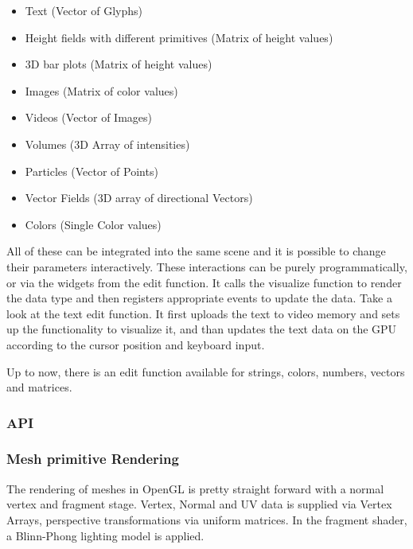 \begin{itemize}
	\item Text (Vector of Glyphs)
	\item Height fields with different primitives (Matrix of height values)
	\item 3D bar plots (Matrix of height values)
	\item Images (Matrix of color values)
	\item Videos (Vector of Images)
	\item Volumes (3D Array of intensities)
	\item Particles (Vector of Points)
	\item Vector Fields (3D array of directional Vectors)
    \item Colors (Single Color values)
\end{itemize}

All of these can be integrated into the same scene and it is possible to change their parameters interactively.
These interactions can be purely programmatically, or via the widgets from the edit function.
It calls the visualize function to render the data type and then registers appropriate events to update the data.
Take a look at the text edit function.
It first uploads the text to video memory and sets up the functionality to visualize it, and than updates the text data on the GPU according to the cursor position and keyboard input.

Up to now, there is an edit function available for strings, colors, numbers, vectors and matrices.



\subsubsection{API}


\subsubsection{Mesh primitive Rendering}
The rendering of meshes in OpenGL is pretty straight forward with a normal vertex and fragment stage.
Vertex, Normal and UV data is supplied via Vertex Arrays, perspective transformations via uniform matrices.
In the fragment shader, a Blinn-Phong lighting model is applied.

